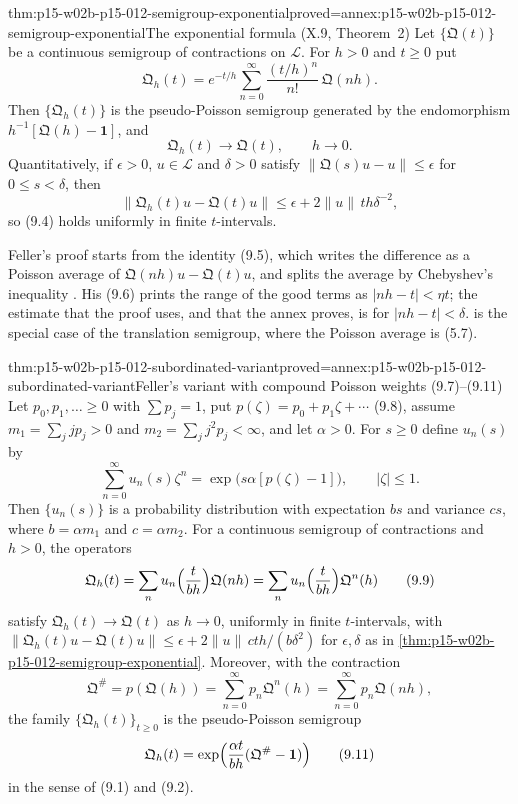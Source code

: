 \begin{hbtheorem}{thm:p15-w02b-p15-012-semigroup-exponential}{proved=annex:p15-w02b-p15-012-semigroup-exponential}{The exponential formula (X.9, Theorem~2)}
Let \(\{\mathfrak Q(t)\}\) be a continuous semigroup of contractions on
\(\mathscr L\). For \(h>0\) and \(t\geq0\) put
\[
 \mathfrak Q_h(t)=e^{-t/h}\sum_{n=0}^\infty\frac{(t/h)^n}{n!}\,\mathfrak Q(nh).
 \tag{9.3}
\]
Then \(\{\mathfrak Q_h(t)\}\) is the pseudo-Poisson semigroup generated by the
endomorphism \(h^{-1}[\mathfrak Q(h)-\mathbf 1]\), and
\[
 \mathfrak Q_h(t)\longrightarrow\mathfrak Q(t),\qquad h\to0 .
 \tag{9.4}
\]
Quantitatively, if \(\epsilon>0\), \(u\in\mathscr L\) and \(\delta>0\) satisfy
\(\|\mathfrak Q(s)u-u\|\leq\epsilon\) for \(0\leq s<\delta\), then
\[
 \|\mathfrak Q_h(t)u-\mathfrak Q(t)u\|\leq\epsilon+2\|u\|\,th\delta^{-2},
\]
so (9.4) holds uniformly in finite \(t\)-intervals.
\end{hbtheorem}

Feller's proof starts from the identity (9.5), which writes the difference as
a Poisson average of \(\mathfrak Q(nh)u-\mathfrak Q(t)u\), and splits the
average by Chebyshev's inequality
\cite[vol.~II, X.9, p.~354]{Feller1971ProbabilityII}. His (9.6) prints the
range of the good terms as \(|nh-t|<\eta t\); the estimate that the proof uses,
and that the annex proves, is for \(|nh-t|<\delta\).
 is the special case of the
translation semigroup, where the Poisson average is (5.7).

\begin{hbtheorem}{thm:p15-w02b-p15-012-subordinated-variant}{proved=annex:p15-w02b-p15-012-subordinated-variant}{Feller's variant with compound Poisson weights (9.7)--(9.11)}
Let \(p_0,p_1,\ldots\geq0\) with \(\sum p_j=1\), put
\(p(\zeta)=p_0+p_1\zeta+\cdots\) (9.8), assume
\(m_1=\sum_jjp_j>0\) and \(m_2=\sum_jj^2p_j<\infty\), and let \(\alpha>0\). For
\(s\geq0\) define \(u_n(s)\) by
\[
 \sum_{n=0}^\infty u_n(s)\zeta^n=\exp\bigl(s\alpha[p(\zeta)-1]\bigr),\qquad|\zeta|\leq1 .
 \tag{9.7}
\]
Then \(\{u_n(s)\}\) is a probability distribution with expectation \(bs\) and
variance \(cs\), where \(b=\alpha m_1\) and \(c=\alpha m_2\). For a continuous
semigroup of contractions and \(h>0\), the operators
\[
 \mathfrak Q_h(t)=\sum_nu_n\Bigl(\frac t{bh}\Bigr)\mathfrak Q(nh)
   =\sum_nu_n\Bigl(\frac t{bh}\Bigr)\mathfrak Q^n(h)
 \tag{9.9}
\]
satisfy \(\mathfrak Q_h(t)\to\mathfrak Q(t)\) as \(h\to0\), uniformly in finite
\(t\)-intervals, with
\(\|\mathfrak Q_h(t)u-\mathfrak Q(t)u\|\leq\epsilon+2\|u\|\,cth/(b\delta^2)\)
for \(\epsilon,\delta\) as in \cref{thm:p15-w02b-p15-012-semigroup-exponential}.
Moreover, with the contraction
\[
 \mathfrak Q^\#=p(\mathfrak Q(h))=\sum_{n=0}^\infty p_n\mathfrak Q^n(h)
   =\sum_{n=0}^\infty p_n\mathfrak Q(nh),
 \tag{9.10}
\]
the family \(\{\mathfrak Q_h(t)\}_{t\geq0}\) is the pseudo-Poisson semigroup
\[
 \mathfrak Q_h(t)=\exp\Bigl(\frac{\alpha t}{bh}(\mathfrak Q^\#-\mathbf 1)\Bigr)
 \tag{9.11}
\]
in the sense of (9.1) and (9.2).
\end{hbtheorem}

